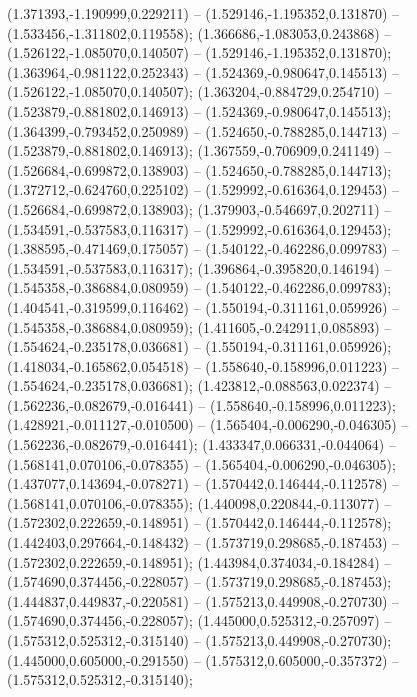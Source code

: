  (1.371393,-1.190999,0.229211) -- (1.529146,-1.195352,0.131870) -- (1.533456,-1.311802,0.119558);
 (1.366686,-1.083053,0.243868) -- (1.526122,-1.085070,0.140507) -- (1.529146,-1.195352,0.131870);
 (1.363964,-0.981122,0.252343) -- (1.524369,-0.980647,0.145513) -- (1.526122,-1.085070,0.140507);
 (1.363204,-0.884729,0.254710) -- (1.523879,-0.881802,0.146913) -- (1.524369,-0.980647,0.145513);
 (1.364399,-0.793452,0.250989) -- (1.524650,-0.788285,0.144713) -- (1.523879,-0.881802,0.146913);
 (1.367559,-0.706909,0.241149) -- (1.526684,-0.699872,0.138903) -- (1.524650,-0.788285,0.144713);
 (1.372712,-0.624760,0.225102) -- (1.529992,-0.616364,0.129453) -- (1.526684,-0.699872,0.138903);
 (1.379903,-0.546697,0.202711) -- (1.534591,-0.537583,0.116317) -- (1.529992,-0.616364,0.129453);
 (1.388595,-0.471469,0.175057) -- (1.540122,-0.462286,0.099783) -- (1.534591,-0.537583,0.116317);
 (1.396864,-0.395820,0.146194) -- (1.545358,-0.386884,0.080959) -- (1.540122,-0.462286,0.099783);
 (1.404541,-0.319599,0.116462) -- (1.550194,-0.311161,0.059926) -- (1.545358,-0.386884,0.080959);
 (1.411605,-0.242911,0.085893) -- (1.554624,-0.235178,0.036681) -- (1.550194,-0.311161,0.059926);
 (1.418034,-0.165862,0.054518) -- (1.558640,-0.158996,0.011223) -- (1.554624,-0.235178,0.036681);
 (1.423812,-0.088563,0.022374) -- (1.562236,-0.082679,-0.016441) -- (1.558640,-0.158996,0.011223);
 (1.428921,-0.011127,-0.010500) -- (1.565404,-0.006290,-0.046305) -- (1.562236,-0.082679,-0.016441);
 (1.433347,0.066331,-0.044064) -- (1.568141,0.070106,-0.078355) -- (1.565404,-0.006290,-0.046305);
 (1.437077,0.143694,-0.078271) -- (1.570442,0.146444,-0.112578) -- (1.568141,0.070106,-0.078355);
 (1.440098,0.220844,-0.113077) -- (1.572302,0.222659,-0.148951) -- (1.570442,0.146444,-0.112578);
 (1.442403,0.297664,-0.148432) -- (1.573719,0.298685,-0.187453) -- (1.572302,0.222659,-0.148951);
 (1.443984,0.374034,-0.184284) -- (1.574690,0.374456,-0.228057) -- (1.573719,0.298685,-0.187453);
 (1.444837,0.449837,-0.220581) -- (1.575213,0.449908,-0.270730) -- (1.574690,0.374456,-0.228057);
 (1.445000,0.525312,-0.257097) -- (1.575312,0.525312,-0.315140) -- (1.575213,0.449908,-0.270730);
 (1.445000,0.605000,-0.291550) -- (1.575312,0.605000,-0.357372) -- (1.575312,0.525312,-0.315140);
